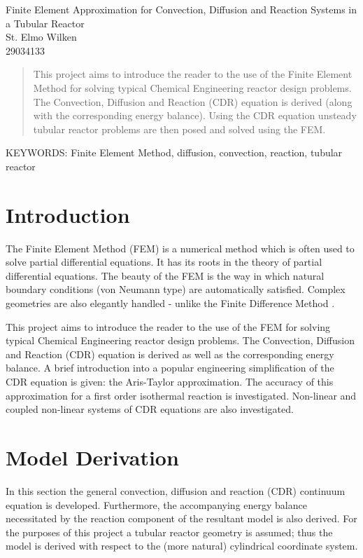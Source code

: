 \documentclass[11pt,fleqn]{article}
\theoremstyle{defstyle}
\begin{document}


\begin{center}
\Large Finite Element Approximation for Convection, Diffusion and Reaction Systems in a Tubular Reactor \\[0.5cm]
\large St. Elmo Wilken \\
29034133
\end{center}

\begin{abstract}
This project aims to introduce the reader to the use of the Finite Element Method for solving typical Chemical Engineering reactor design problems. The Convection, Diffusion and Reaction (CDR) equation is derived (along with the corresponding energy balance). Using the CDR equation unsteady tubular reactor problems are then posed and solved using the FEM.
\end{abstract}

\textsc{\small KEYWORDS:} \small Finite Element Method, diffusion, convection, reaction, tubular reactor
\tableofcontents
{}

\newpage
{}
\section{Introduction}
The Finite Element Method (FEM) is a numerical method which is often used to solve partial differential equations. It has its roots in the theory of partial differential equations. The beauty of the FEM is the way in which natural boundary conditions (von Neumann type) are automatically satisfied. Complex geometries are also elegantly handled - unlike the Finite Difference Method \cite{strang}. 

This project aims to introduce the reader to the use of the FEM for solving typical Chemical Engineering reactor design problems. The Convection, Diffusion and Reaction (CDR) equation is derived as well as the corresponding energy balance. A brief introduction into a popular engineering simplification of the CDR equation is given: the Aris-Taylor approximation. The accuracy of this approximation for a first order isothermal reaction is investigated. Non-linear and coupled non-linear systems of CDR equations are also investigated. 

\section{Model Derivation}
In this section the general convection, diffusion and reaction (CDR) continuum equation is developed. Furthermore, the accompanying energy balance necessitated by the reaction component of the resultant model is also derived. For the purposes of this project a tubular reactor geometry is assumed; thus the model is derived with respect to the (more natural) cylindrical coordinate system. 
\end{document}
